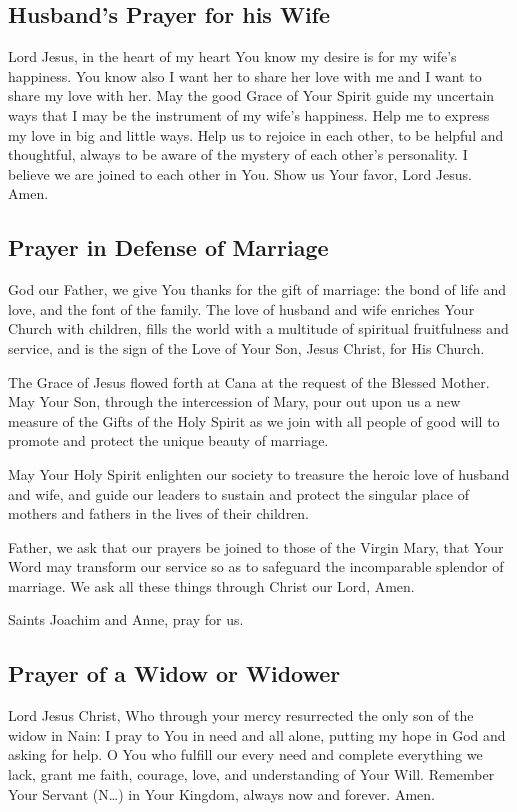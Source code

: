 \documentclass[12pt]{article}
\newcommand{\prayertitle}[1]{\subsection{#1}}
\newcommand{\insertname}{(N\dots)\xspace}
\begin{document}
\prayertitle{Husband's Prayer for his Wife}
Lord Jesus, in the heart of my heart You know my desire is for my wife's happiness.
You know also I want her to share her love with me and I want to share my love with her.
May the good Grace of Your Spirit guide my uncertain ways that I may be the instrument of my wife's happiness.
Help me to express my love in big and little ways.
Help us to rejoice in each other, to be helpful and thoughtful, always to be aware of the mystery of each other's personality.
I believe we are joined to each other in You.
Show us Your favor, Lord Jesus.
Amen.

\prayertitle{Prayer in Defense of Marriage}
\label{prayer:defense_marriage}
God our Father, we give You thanks for the gift of marriage:
the bond of life and love, and the font of the family. 
The love of husband and wife enriches Your Church with children, fills the world with a multitude of spiritual fruitfulness and service,
and is the sign of the Love of Your Son, Jesus Christ, for His Church.

The Grace of Jesus flowed forth at Cana at the request of the Blessed Mother.
May Your Son, through the intercession of Mary, pour out upon us a new measure of the Gifts of the Holy Spirit as we join with all people of good will to promote and protect the unique beauty of marriage.

May Your Holy Spirit enlighten our society to treasure the heroic love of husband and wife, and guide our leaders to sustain and protect
the singular place of mothers and fathers in the lives of their children.

Father, we ask that our prayers be joined to those of the Virgin Mary, that Your Word may transform our service so as to safeguard the incomparable splendor of marriage.
We ask all these things through Christ our Lord,
Amen.

Saints Joachim and Anne, pray for us.

\prayertitle{Prayer of a Widow or Widower}
Lord Jesus Christ, Who through your mercy resurrected the only son of the widow in Nain:
I pray to You in need and all alone, putting my hope in God and asking for help.
O You who fulfill our every need and complete everything we lack, grant me faith, courage, love, and understanding of Your Will.
Remember Your Servant \insertname in Your Kingdom, always now and forever.
Amen.

\newpage
\end{document}
